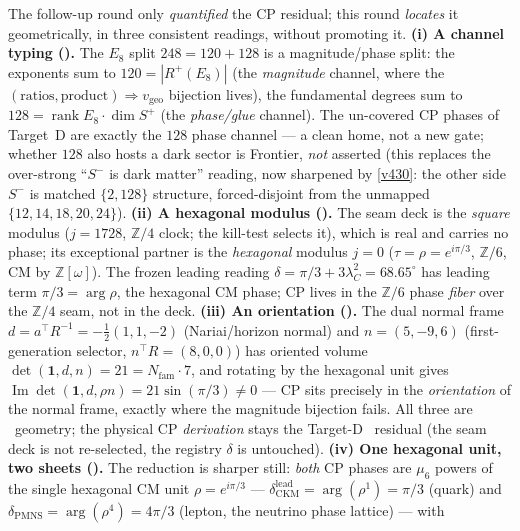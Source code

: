 \documentclass[11pt,a4paper]{article}
\newcommand{\vgeo}{v_{\mathrm{geo}}}
\newcommand{\Nfam}{N_{\mathrm{fam}}}
\providecommand{\Z}{\mathbb{Z}}
\begin{document}
\begin{winbox}
The follow-up round only \emph{quantified} the CP residual; this round \emph{locates} it geometrically,
in three consistent readings, without promoting it. \textbf{(i) A channel typing
().} The $E_8$ split $248=120+128$ is a
magnitude/phase split: the exponents sum to $120=|R^+(E_8)|$ (the \emph{magnitude} channel, where the
$(\text{ratios},\text{product})\Rightarrow\vgeo$ bijection lives), the fundamental degrees sum to
$128=\operatorname{rank}E_8\cdot\dim S^+$ (the \emph{phase/glue} channel). The un-covered CP phases of
Target~D are exactly the $128$ phase channel --- a clean home, not a new gate; whether $128$ also hosts a
dark sector is Frontier, \emph{not} asserted (this replaces the over-strong ``$S^-$ is dark matter''
reading, now sharpened by \vref{v430}: the other side $S^-$ is matched $\{2,128\}$ structure, forced-disjoint from the unmapped $\{12,14,18,20,24\}$). \textbf{(ii) A hexagonal modulus ().} The seam
deck is the \emph{square} modulus ($j{=}1728$, $\Z/4$ clock; the kill-test selects it), which is real and
carries no phase; its exceptional partner is the \emph{hexagonal} modulus $j{=}0$ ($\tau{=}\rho{=}e^{i\pi/3}$,
$\Z/6$, CM by $\Z[\omega]$). The frozen leading reading $\delta=\pi/3+3\lambda_C^2=68.65^\circ$ has leading
term $\pi/3=\arg\rho$, the hexagonal CM phase; CP lives in the $\Z/6$ phase \emph{fiber} over the $\Z/4$ seam,
not in the deck. \textbf{(iii) An orientation ().} The dual
normal frame $d=a^\top R^{-1}=-\tfrac12(1,1,-2)$ (Nariai/horizon normal) and $n=(5,-9,6)$ (first-generation
selector, $n^\top R=(8,0,0)$) has oriented volume $\det(\mathbf1,d,n)=21=\Nfam\cdot7$, and rotating by the
hexagonal unit gives $\operatorname{Im}\det(\mathbf1,d,\rho n)=21\sin(\pi/3)\neq0$ --- CP sits precisely in
the \emph{orientation} of the normal frame, exactly where the magnitude bijection fails. All three are \mE\
geometry; the physical CP \emph{derivation} stays the Target-D \mC\ residual (the seam deck is not
re-selected, the registry $\delta$ is untouched). \textbf{(iv) One hexagonal unit, two sheets
(\veri{v231\_cp\_mu6\_phases.py}).} The reduction is sharper still: \emph{both} CP phases are $\mu_6$ powers
of the single hexagonal CM unit $\rho=e^{i\pi/3}$ --- $\delta_{\mathrm{CKM}}^{\mathrm{lead}}=\arg(\rho^1)
=\pi/3$ (quark) and $\delta_{\mathrm{PMNS}}=\arg(\rho^4)=4\pi/3$ (lepton, the neutrino phase lattice) --- with

\end{winbox}
\end{document}
